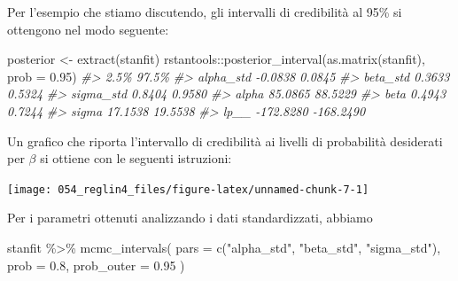 \documentclass[
  10pt,
  italian,
  a4paper,
  extrafontsizes,onecolumn,openright
  ]{memoir}
\newenvironment{Shaded}{\begin{snugshade}}{\end{snugshade}}
\newcommand{\AttributeTok}[1]{\textcolor[rgb]{0.77,0.63,0.00}{#1}}
\newcommand{\CommentTok}[1]{\textcolor[rgb]{0.56,0.35,0.01}{\textit{#1}}}
\newcommand{\FloatTok}[1]{\textcolor[rgb]{0.00,0.00,0.81}{#1}}
\newcommand{\FunctionTok}[1]{\textcolor[rgb]{0.00,0.00,0.00}{#1}}
\newcommand{\NormalTok}[1]{#1}
\newcommand{\OtherTok}[1]{\textcolor[rgb]{0.56,0.35,0.01}{#1}}
\newcommand{\SpecialCharTok}[1]{\textcolor[rgb]{0.00,0.00,0.00}{#1}}
\newcommand{\StringTok}[1]{\textcolor[rgb]{0.31,0.60,0.02}{#1}}
\begin{document}
Per l'esempio che stiamo discutendo, gli intervalli di credibilità al 95\% si ottengono nel modo seguente:

\begin{Shaded}
\begin{Highlighting}[]
\NormalTok{posterior }\OtherTok{\textless{}{-}} \FunctionTok{extract}\NormalTok{(stanfit)}
\NormalTok{rstantools}\SpecialCharTok{::}\FunctionTok{posterior\_interval}\NormalTok{(}\FunctionTok{as.matrix}\NormalTok{(stanfit), }\AttributeTok{prob =} \FloatTok{0.95}\NormalTok{)}
\CommentTok{\#\textgreater{}                2.5\%     97.5\%}
\CommentTok{\#\textgreater{} alpha\_std   {-}0.0838    0.0845}
\CommentTok{\#\textgreater{} beta\_std     0.3633    0.5324}
\CommentTok{\#\textgreater{} sigma\_std    0.8404    0.9580}
\CommentTok{\#\textgreater{} alpha       85.0865   88.5229}
\CommentTok{\#\textgreater{} beta         0.4943    0.7244}
\CommentTok{\#\textgreater{} sigma       17.1538   19.5538}
\CommentTok{\#\textgreater{} lp\_\_      {-}172.8280 {-}168.2490}
\end{Highlighting}
\end{Shaded}

Un grafico che riporta l'intervallo di credibilità ai livelli di probabilità desiderati per \(\beta\) si ottiene con le seguenti istruzioni:

\begin{Shaded}
\end{Shaded}

\begin{center}\texttt{[image: 054\_reglin4\_files/figure-latex/unnamed-chunk-7-1]} \end{center}

Per i parametri ottenuti analizzando i dati standardizzati, abbiamo

\begin{Shaded}
\begin{Highlighting}[]
\NormalTok{stanfit }\SpecialCharTok{\%\textgreater{}\%}
  \FunctionTok{mcmc\_intervals}\NormalTok{(}
    \AttributeTok{pars =} \FunctionTok{c}\NormalTok{(}\StringTok{"alpha\_std"}\NormalTok{, }\StringTok{"beta\_std"}\NormalTok{, }\StringTok{"sigma\_std"}\NormalTok{), }
    \AttributeTok{prob =} \FloatTok{0.8}\NormalTok{,}
    \AttributeTok{prob\_outer =} \FloatTok{0.95}
\NormalTok{  )}
\end{Highlighting}
\end{Shaded}
\end{document}
